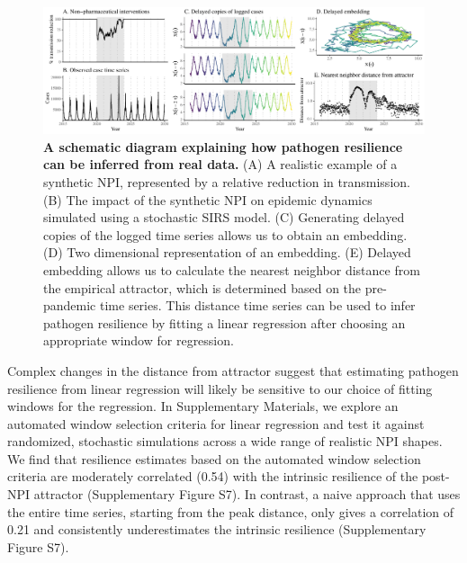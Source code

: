 \documentclass[12pt]{article}
\begin{document}
\begin{figure}[!ht]
\includegraphics[width=\textwidth]{../figure3/figure3.pdf}
\caption{
\textbf{A schematic diagram explaining how pathogen resilience can be inferred from real data.}
(A) A realistic example of a synthetic NPI, represented by a relative reduction in transmission.
(B) The impact of the synthetic NPI on epidemic dynamics simulated using a stochastic SIRS model.
(C) Generating delayed copies of the logged time series allows us to obtain an embedding.
(D) Two dimensional representation of an embedding.
(E) Delayed embedding allows us to calculate the nearest neighbor distance from the empirical attractor, which is determined based on the pre-pandemic time series.
This distance time series can be used to infer pathogen resilience by fitting a linear regression after choosing an appropriate window for regression.
}
\end{figure}

Complex changes in the distance from attractor suggest that estimating pathogen resilience from linear regression will likely be sensitive to our choice of fitting windows for the regression.
In Supplementary Materials, we explore an automated window selection criteria for linear regression and test it against randomized, stochastic simulations across a wide range of realistic NPI shapes.
We find that resilience estimates based on the automated window selection criteria are moderately correlated (0.54) with the intrinsic resilience of the post-NPI attractor (Supplementary Figure S7).
In contrast, a naive approach that uses the entire time series, starting from the peak distance, only gives a correlation of 0.21 and consistently underestimates the intrinsic resilience (Supplementary Figure S7).

\end{document}
